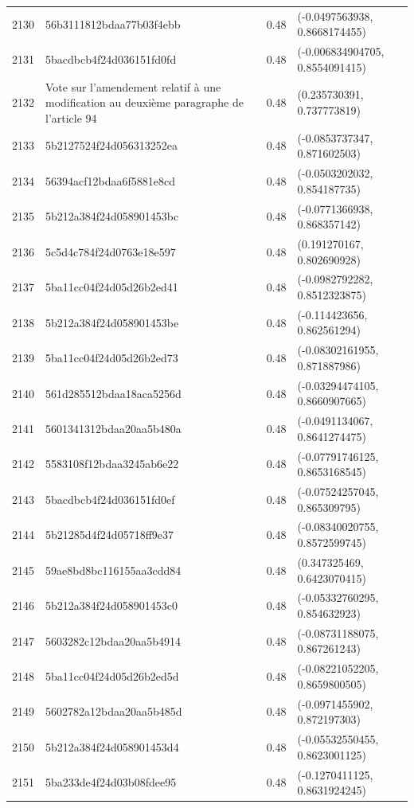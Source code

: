 \begin{table}[ht]
\begin{tabular}{rlrl}
  2130 & 56b3111812bdaa77b03f4ebb & 0.48 & (-0.0497563938, 0.8668174455) \\ 
  2131 & 5bacdbcb4f24d036151fd0fd & 0.48 & (-0.006834904705, 0.8554091415) \\ 
  2132 & Vote sur l'amendement relatif à une modification au deuxième paragraphe de l'article 94 & 0.48 & (0.235730391, 0.737773819) \\ 
  2133 & 5b2127524f24d056313252ea & 0.48 & (-0.0853737347, 0.871602503) \\ 
  2134 & 56394acf12bdaa6f5881e8cd & 0.48 & (-0.0503202032, 0.854187735) \\ 
  2135 & 5b212a384f24d058901453bc & 0.48 & (-0.0771366938, 0.868357142) \\ 
  2136 & 5c5d4c784f24d0763e18e597 & 0.48 & (0.191270167, 0.802690928) \\ 
  2137 & 5ba11cc04f24d05d26b2ed41 & 0.48 & (-0.0982792282, 0.8512323875) \\ 
  2138 & 5b212a384f24d058901453be & 0.48 & (-0.114423656, 0.862561294) \\ 
  2139 & 5ba11cc04f24d05d26b2ed73 & 0.48 & (-0.08302161955, 0.871887986) \\ 
  2140 & 561d285512bdaa18aca5256d & 0.48 & (-0.03294474105, 0.8660907665) \\ 
  2141 & 5601341312bdaa20aa5b480a & 0.48 & (-0.0491134067, 0.8641274475) \\ 
  2142 & 5583108f12bdaa3245ab6e22 & 0.48 & (-0.07791746125, 0.8653168545) \\ 
  2143 & 5bacdbcb4f24d036151fd0ef & 0.48 & (-0.07524257045, 0.865309795) \\ 
  2144 & 5b21285d4f24d05718ff9e37 & 0.48 & (-0.08340020755, 0.8572599745) \\ 
  2145 & 59ae8bd8bc116155aa3cdd84 & 0.48 & (0.347325469, 0.6423070415) \\ 
  2146 & 5b212a384f24d058901453c0 & 0.48 & (-0.05332760295, 0.854632923) \\ 
  2147 & 5603282c12bdaa20aa5b4914 & 0.48 & (-0.08731188075, 0.867261243) \\ 
  2148 & 5ba11cc04f24d05d26b2ed5d & 0.48 & (-0.08221052205, 0.8659800505) \\ 
  2149 & 5602782a12bdaa20aa5b485d & 0.48 & (-0.0971455902, 0.872197303) \\ 
  2150 & 5b212a384f24d058901453d4 & 0.48 & (-0.05532550455, 0.8623001125) \\ 
  2151 & 5ba233de4f24d03b08fdee95 & 0.48 & (-0.1270411125, 0.8631924245) \\ 

\end{tabular}
\end{table}
